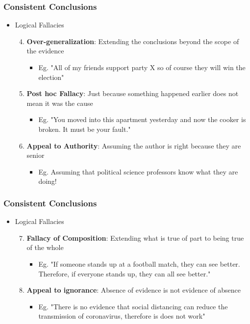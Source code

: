 \documentclass[xcolor=x11names,compress]{beamer}\usepackage[]{graphicx}\usepackage[]{xcolor}
\renewcommand{\(}{\begin{columns}}
\renewcommand{\)}{\end{columns}}
\newcommand{\<}[1]{\begin{column}{#1}}
\renewcommand{\>}{\end{column}}
\begin{document}
\begin{frame}
\frametitle{Consistent Conclusions}
\begin{itemize}
\item Logical Fallacies
\pause
\begin{enumerate}
\setcounter{enumi}{3}
\item \textbf{Over-generalization}: Extending the conclusions beyond the scope of the evidence
\begin{itemize}
\item Eg. "All of my friends support party X so of course they will win the election"
\pause
\end{itemize}
\item \textbf{Post hoc Fallacy}: Just because something happened earlier does not mean it was the cause
\begin{itemize}
\item Eg. "You moved into this apartment yesterday and now the cooker is broken. It must be your fault."
\pause
\end{itemize}
\item \textbf{Appeal to Authority}: Assuming the author is right because they are senior
\begin{itemize}
\item Eg. Assuming that political science professors know what they are doing!
\end{itemize}
\end{enumerate}
\end{itemize}
\end{frame}

\begin{frame}
\frametitle{Consistent Conclusions}
\begin{itemize}
\item Logical Fallacies
\begin{enumerate}
\setcounter{enumi}{6}
\item \textbf{Fallacy of Composition}: Extending what is true of part to being true of the whole
\pause
\begin{itemize}
\item Eg. "If someone stands up at a football match, they can see better. Therefore, if everyone stands up, they can all see better."
\end{itemize}
\item \textbf{Appeal to ignorance}: Absence of evidence is not evidence of absence
\begin{itemize}
\item Eg. "There is no evidence that social distancing can reduce the transmission of coronavirus, therefore is does not work"
\end{itemize}
\end{enumerate}
\end{itemize}
\end{frame}
\end{document}
